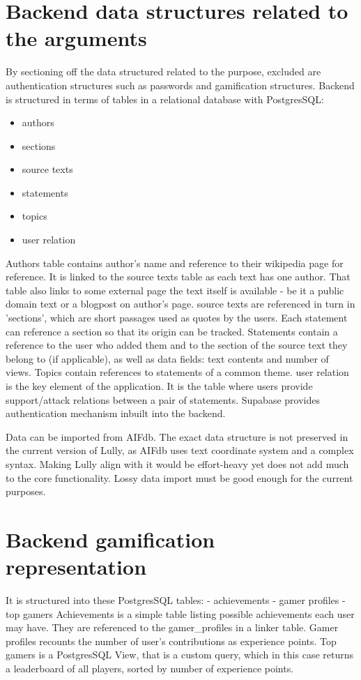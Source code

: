 \documentclass{report}
\begin{document}
{\section{Backend data structures related to the arguments}
By sectioning off the data structured related to the purpose, excluded are authentication structures such as passwords and gamification structures.
Backend is structured in terms of tables in a relational database with PostgresSQL:
\begin{itemize}
  \item authors
  \item sections
  \item source texts
  \item statements
  \item topics
  \item user relation
\end{itemize}
Authors table contains author's name and reference to their wikipedia page for reference. It is linked to the source texts table as each text has one author. That table also links to some external page the text itself is available - be it a public domain text or a blogpost on author's page. source texts are referenced in turn in 'sections', which are short passages used as quotes by the users.
Each statement can reference a section so that its origin can be tracked. Statements contain a reference to the user who added them and to the section of the source text they belong to (if applicable), as well as data fields: text contents and number of views. Topics contain references to statements of a common theme.
user relation is the key element of the application. It is the table where users provide support/attack relations between a pair of statements. 
Supabase provides authentication mechanism inbuilt into the backend.

Data can be imported from AIFdb. The exact data structure is not preserved in the current version of Lully, as AIFdb uses text coordinate system and a complex syntax. Making Lully align with it would be effort-heavy yet does not add much to the core functionality. Lossy data import must be good enough for the current purposes.

\section{Backend gamification representation}

It is structured into these PostgresSQL tables:
- achievements
- gamer profiles 
- top gamers 
Achievements is a simple table listing possible achievements each user may have. They are referenced to the gamer_profiles in a linker table. Gamer profiles recounts the number of user's contributions as experience points.
Top gamers is a PostgresSQL View, that is a custom query, which in this case returns a leaderboard of all players, sorted by number of experience points.

}
\end{document}

